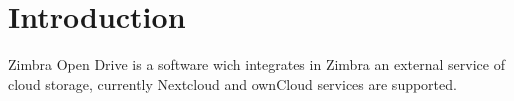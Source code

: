 \chapter{Introduction}

Zimbra Open Drive is a software wich integrates in Zimbra an external service of cloud storage,
currently Nextcloud and ownCloud services are supported.



